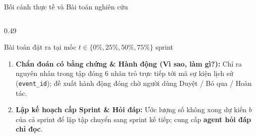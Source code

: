 \begin{frame}{Bối cảnh thực tế và Bài toán nghiên cứu}
\begin{columns}[T,onlytextwidth]
\begin{column}{0.49\textwidth}
\begin{alertblock}{Bài toán đặt ra tại mốc $t \in \{0\%, 25\%, 50\%, 75\%\}$ sprint}
\begin{enumerate}
          \item \textbf{Chẩn đoán có bằng chứng \& Hành động (Vì sao, làm gì?):} Chỉ ra nguyên nhân trong tập đóng 6 nhãn trỏ trực tiếp tới mã sự kiện lịch sử (\texttt{event\_id}); đề xuất hành động đóng chờ người dùng \alert{Duyệt / Bỏ qua / Hoàn tác}.
          \item \textbf{Lập kế hoạch cấp Sprint \& Hỏi đáp:} Ước lượng số không xong dự kiến $b$ của cả sprint để lập tập chuyển sang sprint kế tiếp; cung cấp \textbf{agent hỏi đáp chỉ đọc}.
        \end{enumerate}
      \end{alertblock}
    \end{column}
  \end{columns}
\end{frame}

